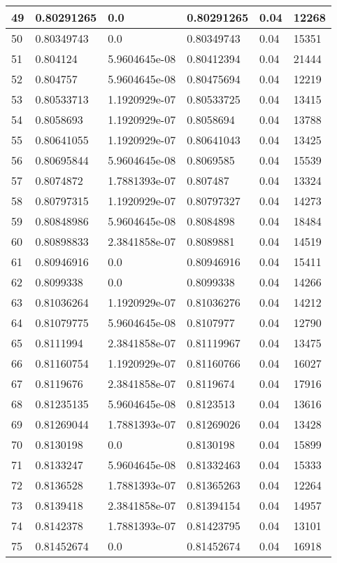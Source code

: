 \begin{longtable}{|l|l|l|l|l|l|}
49 & 0.80291265 & 0.0 & 0.80291265 & 0.04 & 12268 \\ \hline 
50 & 0.80349743 & 0.0 & 0.80349743 & 0.04 & 15351 \\ \hline 
51 & 0.804124 & 5.9604645e-08 & 0.80412394 & 0.04 & 21444 \\ \hline 
52 & 0.804757 & 5.9604645e-08 & 0.80475694 & 0.04 & 12219 \\ \hline 
53 & 0.80533713 & 1.1920929e-07 & 0.80533725 & 0.04 & 13415 \\ \hline 
54 & 0.8058693 & 1.1920929e-07 & 0.8058694 & 0.04 & 13788 \\ \hline 
55 & 0.80641055 & 1.1920929e-07 & 0.80641043 & 0.04 & 13425 \\ \hline 
56 & 0.80695844 & 5.9604645e-08 & 0.8069585 & 0.04 & 15539 \\ \hline 
57 & 0.8074872 & 1.7881393e-07 & 0.807487 & 0.04 & 13324 \\ \hline 
58 & 0.80797315 & 1.1920929e-07 & 0.80797327 & 0.04 & 14273 \\ \hline 
59 & 0.80848986 & 5.9604645e-08 & 0.8084898 & 0.04 & 18484 \\ \hline 
60 & 0.80898833 & 2.3841858e-07 & 0.8089881 & 0.04 & 14519 \\ \hline 
61 & 0.80946916 & 0.0 & 0.80946916 & 0.04 & 15411 \\ \hline 
62 & 0.8099338 & 0.0 & 0.8099338 & 0.04 & 14266 \\ \hline 
63 & 0.81036264 & 1.1920929e-07 & 0.81036276 & 0.04 & 14212 \\ \hline 
64 & 0.81079775 & 5.9604645e-08 & 0.8107977 & 0.04 & 12790 \\ \hline 
65 & 0.8111994 & 2.3841858e-07 & 0.81119967 & 0.04 & 13475 \\ \hline 
66 & 0.81160754 & 1.1920929e-07 & 0.81160766 & 0.04 & 16027 \\ \hline 
67 & 0.8119676 & 2.3841858e-07 & 0.8119674 & 0.04 & 17916 \\ \hline 
68 & 0.81235135 & 5.9604645e-08 & 0.8123513 & 0.04 & 13616 \\ \hline 
69 & 0.81269044 & 1.7881393e-07 & 0.81269026 & 0.04 & 13428 \\ \hline 
70 & 0.8130198 & 0.0 & 0.8130198 & 0.04 & 15899 \\ \hline 
71 & 0.8133247 & 5.9604645e-08 & 0.81332463 & 0.04 & 15333 \\ \hline 
72 & 0.8136528 & 1.7881393e-07 & 0.81365263 & 0.04 & 12264 \\ \hline 
73 & 0.8139418 & 2.3841858e-07 & 0.81394154 & 0.04 & 14957 \\ \hline 
74 & 0.8142378 & 1.7881393e-07 & 0.81423795 & 0.04 & 13101 \\ \hline 
75 & 0.81452674 & 0.0 & 0.81452674 & 0.04 & 16918 \\ \hline 
\end{longtable}